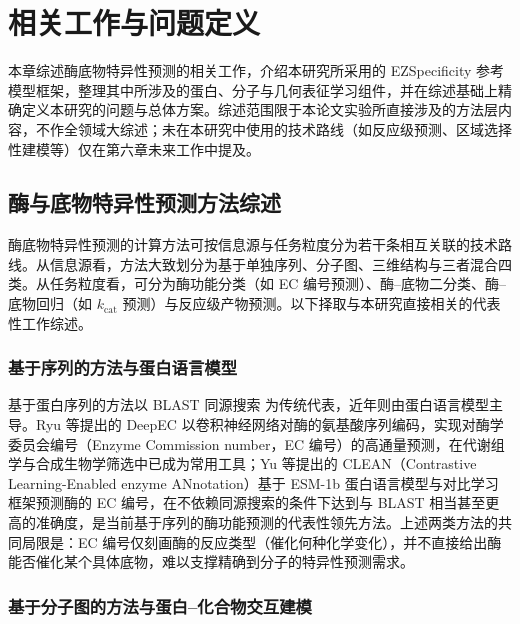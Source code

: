 
\chapter{相关工作与问题定义}
\label{cha:relatedwork}

本章综述酶底物特异性预测的相关工作，介绍本研究所采用的 EZSpecificity 参考模型框架，整理其中所涉及的蛋白、分子与几何表征学习组件，并在综述基础上精确定义本研究的问题与总体方案。综述范围限于本论文实验所直接涉及的方法层内容，不作全领域大综述；未在本研究中使用的技术路线（如反应级预测、区域选择性建模等）仅在第六章未来工作中提及。

\section{酶与底物特异性预测方法综述}
\label{sec:methods-survey}

酶底物特异性预测的计算方法可按信息源与任务粒度分为若干条相互关联的技术路线。从信息源看，方法大致划分为基于单独序列、分子图、三维结构与三者混合四类。从任务粒度看，可分为酶功能分类（如 EC 编号预测）、酶--底物二分类、酶--底物回归（如 $k_{\mathrm{cat}}$ 预测）与反应级产物预测。以下择取与本研究直接相关的代表性工作综述。

\subsection{基于序列的方法与蛋白语言模型}
\label{subsec:methods-seq}

基于蛋白序列的方法以 BLAST 同源搜索\cite{BLAST1990} 为传统代表，近年则由蛋白语言模型主导。Ryu 等提出的 DeepEC\cite{DeepEC2019} 以卷积神经网络对酶的氨基酸序列编码，实现对酶学委员会编号（Enzyme Commission number，EC 编号）的高通量预测，在代谢组学与合成生物学筛选中已成为常用工具；Yu 等提出的 CLEAN\cite{CLEAN2023}（Contrastive Learning-Enabled enzyme ANnotation）基于 ESM-1b 蛋白语言模型与对比学习框架预测酶的 EC 编号，在不依赖同源搜索的条件下达到与 BLAST 相当甚至更高的准确度，是当前基于序列的酶功能预测的代表性领先方法。上述两类方法的共同局限是：EC 编号仅刻画酶的反应类型（催化何种化学变化），并不直接给出酶能否催化某个具体底物，难以支撑精确到分子的特异性预测需求。

\subsection{基于分子图的方法与蛋白--化合物交互建模}
\label{subsec:methods-cpi}

